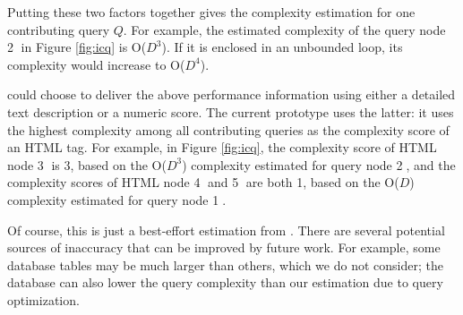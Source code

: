 Putting these two factors together gives \Tool the complexity estimation
for one contributing query $Q$. For example, the estimated complexity of the 
query node {\large \textcircled{\small 2}} in Figure \ref{fig:icq} is O($D^3$). If it is
enclosed in an unbounded loop, its complexity would increase to O($D^4$).

\Tool could choose to deliver the above performance information using either a 
detailed text description or a numeric score. The current prototype
uses the latter: it uses the highest 
complexity among all contributing queries as the complexity score of an
HTML tag. For example, in Figure \ref{fig:icq}, 
the complexity score of HTML node {\large \textcircled{\small 3}} is 3, based
on the O($D^3$) complexity estimated for query node  {\large \textcircled{\small 2}}, and
the complexity scores of HTML node {\large \textcircled{\small 4}} and  {\large \textcircled{\small 5}}  are
both 1, based on the O($D$) complexity estimated for query node
{\large \textcircled{\small 1}}.

Of course, this is just a best-effort estimation from \Tool. There are 
several potential
sources of inaccuracy that can be improved by future work.
For example, some database tables may be much larger than others, which
we do not consider; the database can also lower the
query complexity than our estimation due to query optimization.

\iffalse
{\tt where}, 
{\tt all}, 
{\tt group}, 
{\tt join}, 
{\tt find}, 
{\tt includes}, 
{\tt teager\_load}, 
{\tt order}, 
{\tt count}, 
{\tt sum}, 
{\tt maximum}, 
{\tt minimum}, 
{\tt average}, 
{\tt having}, and 
{\tt calculate}. \cong{I think no need to mention query chain. Just say the SQL query type and how we estimate.}
\Tool currently assigns equal cost scores for each such operator.
\fi



 
